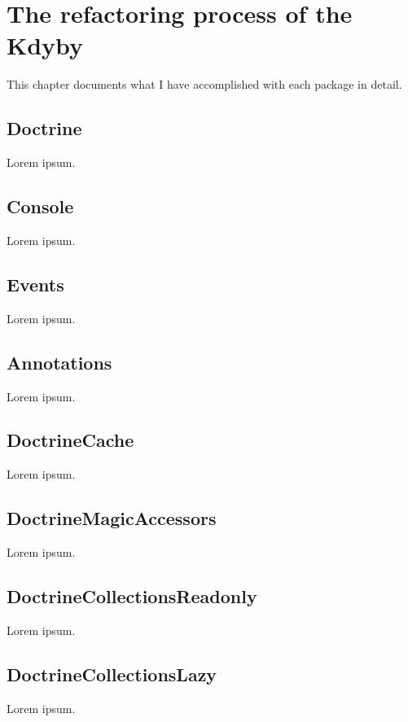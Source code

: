 \chapter{The refactoring process of the Kdyby}

This chapter documents what I have accomplished with each package in detail.

\section{Doctrine}

Lorem ipsum.

\section{Console}

Lorem ipsum.

\section{Events}

Lorem ipsum.

\section{Annotations}

Lorem ipsum.

\section{DoctrineCache}

Lorem ipsum.

\section{DoctrineMagicAccessors}

Lorem ipsum.

\section{DoctrineCollectionsReadonly}

Lorem ipsum.

\section{DoctrineCollectionsLazy}

Lorem ipsum.


